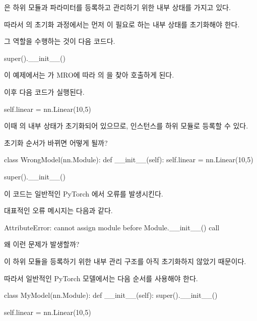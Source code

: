 은 하위 모듈과 파라미터를 등록하고 관리하기 위한 내부 상태를 가지고 있다.

따라서 의 초기화 과정에서는 먼저 이 필요로 하는 내부 상태를 초기화해야 한다.

그 역할을 수행하는 것이 다음 코드다.

\begin{dhkcode}
super().__init__()
\end{dhkcode}

이 예제에서는 가 MRO에 따라 의 을 찾아 호출하게 된다.

이후 다음 코드가 실행된다.

\begin{dhkcode}
self.linear = nn.Linear(10,5)
\end{dhkcode}

이때 의 내부 상태가 초기화되어 있으므로,  인스턴스를 하위 모듈로 등록할 수 있다.

\begin{dhknote}
\begin{dhksmry}[centered]
초기화 순서가 바뀌면 어떻게 될까?
\end{dhksmry}
\end{dhknote}

\begin{dhkcode}
class WrongModel(nn.Module):
    def __init__(self):
        self.linear = nn.Linear(10,5)

        super().__init__()
\end{dhkcode}

이 코드는 일반적인 PyTorch 에서 오류를 발생시킨다.

대표적인 오류 메시지는 다음과 같다.

\begin{dhkzsh}
AttributeError: cannot assign module before Module.__init__() call
\end{dhkzsh}

왜 이런 문제가 발생할까?

이 하위 모듈을 등록하기 위한 내부 관리 구조를 아직 초기화하지 않았기 때문이다.

따라서 일반적인 PyTorch 모델에서는 다음 순서를 사용해야 한다.

\begin{dhkcode}
class MyModel(nn.Module):
    def __init__(self):
        super().__init__()

        self.linear = nn.Linear(10,5)
\end{dhkcode}

